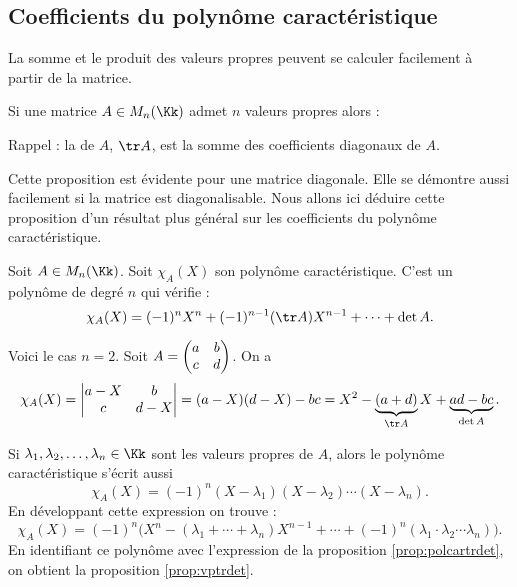 \documentclass[11pt, class=report,crop=false]{standalone}
\begin{document}
\subsection{Coefficients du polynôme caractéristique}

La somme et le produit des valeurs propres peuvent se calculer facilement à partir de la matrice.

\begin{proposition}
\label{prop:vptrdet}
Si une matrice $A \in M_n(\Kk)$ admet $n$ valeurs propres alors :


\end{proposition}

Rappel : la  de $A$, $\tr A$, est la somme des coefficients diagonaux de $A$.


Cette proposition est évidente pour une matrice diagonale. Elle se démontre aussi facilement si la matrice est diagonalisable. Nous allons ici déduire cette proposition 
d'un résultat plus général sur les coefficients du polynôme caractéristique.


\begin{proposition}
\label{prop:polcartrdet}
Soit $A \in M_n(\Kk)$. Soit $\chi_A(X)$ son polynôme caractéristique.
C'est un polynôme de degré $n$ qui vérifie :
$$\chi_A(X)=(-1)^n X^n + (-1)^{n-1}(\tr A)X^{n-1}+\dots+\det A.$$
\end{proposition} 


\begin{exemple}
Voici le cas $n=2$. Soit $A=\left(\begin{matrix}a&b\cr c&d\end{matrix}\right)$.
On a $$\chi_A(X)=\left|\begin{matrix}a-X&b\cr c& d-X\end{matrix}\right|
=(a-X)(d-X)-bc=X^2 -\underbrace{(a+d)}_{\tr A}X+
\underbrace{ad-bc}_{\det A}.$$
\end{exemple}



\begin{exemple}
Si $\lambda_1,\lambda_2,\ldots,\lambda_n \in \Kk$ sont les valeurs propres de $A$, alors le polynôme caractéristique s'écrit aussi
$$\chi_A(X) = (-1)^n (X-\lambda_1)(X-\lambda_2)\cdots(X-\lambda_n).$$
En développant cette expression on trouve :
$$\chi_A(X) = (-1)^n \Big(X^n - (\lambda_1+\cdots+\lambda_n) X^{n-1}+\cdots + (-1)^n(\lambda_1\cdot\lambda_2\cdots\lambda_n)\Big).$$
En identifiant ce polynôme avec l'expression de la proposition \ref{prop:polcartrdet}, on obtient la proposition \ref{prop:vptrdet}.
\end{exemple}
\end{document}
